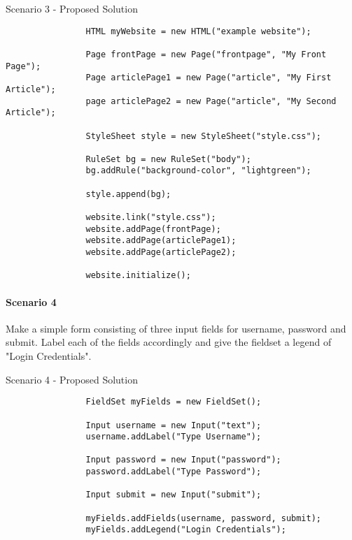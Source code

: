 \documentclass[12pt]{article}
\begin{document}
        \begin{shaded}
            Scenario 3 - Proposed Solution
            \begin{lstlisting}
                HTML myWebsite = new HTML("example website");
                
                Page frontPage = new Page("frontpage", "My Front Page");
                Page articlePage1 = new Page("article", "My First Article");
                page articlePage2 = new Page("article", "My Second Article");

                StyleSheet style = new StyleSheet("style.css");

                RuleSet bg = new RuleSet("body");
                bg.addRule("background-color", "lightgreen");

                style.append(bg);

                website.link("style.css");
                website.addPage(frontPage);
                website.addPage(articlePage1);
                website.addPage(articlePage2);

                website.initialize();
            \end{lstlisting}
        \end{shaded}

        \paragraph{Scenario 4}
        Make a simple form consisting of three input fields for username, password and submit. Label each of the fields accordingly and give the fieldset a legend of "Login Credentials".

        \begin{shaded}
            Scenario 4 - Proposed Solution
            \begin{lstlisting}
                FieldSet myFields = new FieldSet();

                Input username = new Input("text");
                username.addLabel("Type Username");
                
                Input password = new Input("password");
                password.addLabel("Type Password");
                
                Input submit = new Input("submit");

                myFields.addFields(username, password, submit);
                myFields.addLegend("Login Credentials");
            \end{lstlisting}
        \end{shaded}
\end{document}

